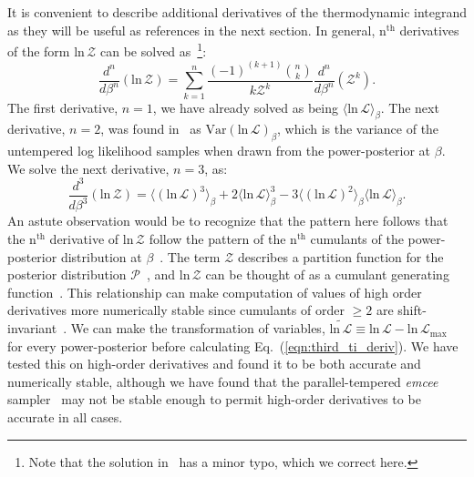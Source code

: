 It is convenient to describe additional derivatives of the thermodynamic integrand as they will be useful as references in the next section. In general, $\mathrm{n}^{\mathrm{th}}$ derivatives of the form $\mathrm{ln} \, \mathcal{Z}$ can be solved as~\citep{gradshteyn2015table}\footnote{Note that the solution in~\cite{gradshteyn2015table} has a minor typo, which we correct here.}:
\begin{equation}\label{eqn:gradshteyn_derivatives}
    \frac{d^n}{d\beta^n}\left( \mathrm{ln} \, \mathcal{Z} \right) = \sum_{k=1}^{n} \frac{(-1)^{(k+1)} {{n}\choose{k}}}{k \mathcal{Z}^k} \frac{d^n}{d\beta^n} \left(\mathcal{Z}^k\right).
\end{equation}
The first derivative, $n=1$, we have already solved as being $\langle \mathrm{ln} \, \mathcal{L} \rangle_\beta$. The next derivative, $n=2$, was found in~\cite{friel2014improving} as $\mathrm{Var}(\mathrm{ln} \, \mathcal{L})_\beta$, which is the variance of the untempered log likelihood samples when drawn from the power-posterior at $\beta$. We solve the next derivative, $n=3$, as:
\begin{equation}\label{eqn:third_ti_deriv}
    \frac{d^3}{d\beta^3}\left( \mathrm{ln} \, \mathcal{Z}\right) = \langle \left(\mathrm{ln} \, \mathcal{L} \right)^3\rangle_\beta + 2 \langle \mathrm{ln} \, \mathcal{L} \rangle^3_\beta - 3 \langle \left(\mathrm{ln} \, \mathcal{L} \right)^2\rangle_\beta \langle \mathrm{ln} \, \mathcal{L}\rangle_\beta.
\end{equation}
An astute observation would be to recognize that the pattern here follows that the $\mathrm{n}^{\mathrm{th}}$ derivative of $\mathrm{ln} \, \mathcal{Z}$ follow the pattern of the $\mathrm{n}^{\mathrm{th}}$ cumulants of the power-posterior distribution at $\beta$~\cite{friel2014improving, carlson2016partition}. The term $\mathcal{Z}$ describes a partition function for the posterior distribution $\mathcal{P}$~\citep{carlson2016partition, lamont2019correspondence}, and $\mathrm{ln} \, \mathcal{Z}$ can be thought of as a cumulant generating function~\citep{kardar2007statistical}. This relationship can make computation of values of high order derivatives more numerically stable since cumulants of order $\ge 2$ are shift-invariant~\cite{kardar2007statistical}. We can make the transformation of variables, $\widetilde{\mathrm{ln} \, \mathcal{L}} \equiv \mathrm{ln} \, \mathcal{L} - \mathrm{ln} \, \mathcal{L}_{\mathrm{max}}$ for every power-posterior before calculating Eq.~(\ref{eqn:third_ti_deriv}). We have tested this on high-order derivatives and found it to be both accurate and numerically stable, although we have found that the parallel-tempered \emph{emcee} sampler~\citep{emcee,vousden:2016} may not be stable enough to permit high-order derivatives to be accurate in all cases.

